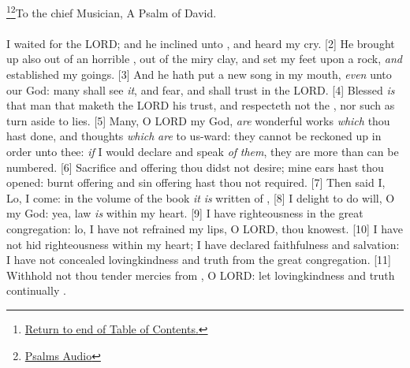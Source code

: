 \footnote{\textcolor[cmyk]{0.99998,1,0,0}{\hyperlink{TOC}{Return to end of Table of Contents.}}}\footnote{\href{https://audiobible.com/bible}{\textcolor[cmyk]{0.99998,1,0,0}{Psalms Audio}}}\textcolor[cmyk]{0.99998,1,0,0}{To the chief Musician, A Psalm of David.}\\
\\
\textcolor[cmyk]{0.99998,1,0,0}{I waited  for the LORD; and he inclined unto , and heard my cry.}
[2] \textcolor[cmyk]{0.99998,1,0,0}{He brought  up also out of an horrible , out of the miry clay, and set my feet upon a rock, \emph{and} established my goings.}
[3] \textcolor[cmyk]{0.99998,1,0,0}{And he hath put a new song in my mouth, \emph{even}  unto our God: many shall see \emph{it}, and fear, and shall trust in the LORD.}
[4] \textcolor[cmyk]{0.99998,1,0,0}{Blessed \emph{is} that man that maketh the LORD his trust, and respecteth not the , nor such as turn aside to lies.}
[5] \textcolor[cmyk]{0.99998,1,0,0}{Many, O LORD my God, \emph{are}  wonderful works \emph{which} thou hast done, and  thoughts \emph{which} \emph{are} to us-ward: they cannot be reckoned up in order unto thee: \emph{if} I would declare and speak \emph{of} \emph{them}, they are more than can be numbered.}
[6] \textcolor[cmyk]{0.99998,1,0,0}{Sacrifice and offering thou didst not desire; mine ears hast thou opened: burnt offering and sin offering hast thou not required.}
[7] \textcolor[cmyk]{0.99998,1,0,0}{Then said I, Lo, I come: in the volume of the book \emph{it} \emph{is} written of ,}
[8] \textcolor[cmyk]{0.99998,1,0,0}{I delight to do  will, O my God: yea,  law \emph{is} within my heart.}
[9] \textcolor[cmyk]{0.99998,1,0,0}{I have  righteousness in the great congregation: lo, I have not refrained my lips, O LORD, thou knowest.}
[10] \textcolor[cmyk]{0.99998,1,0,0}{I have not hid  righteousness within my heart; I have declared  faithfulness and  salvation: I have not concealed  lovingkindness and  truth from the great congregation.}
[11] \textcolor[cmyk]{0.99998,1,0,0}{Withhold not thou  tender mercies from , O LORD: let  lovingkindness and  truth continually  .}
